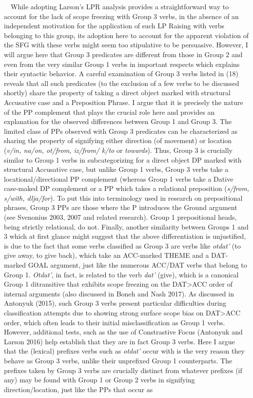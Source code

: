 \documentclass[12pt]{article}
\newenvironment{styleStandard}{\renewcommand\baselinestretch{1.0}\setlength\leftskip{0cm}\setlength\rightskip{0cm plus 1fil}\setlength\parindent{0cm}\setlength\parfillskip{0pt plus 1fil}\setlength\parskip{0in plus 1pt}\writerlistparindent\writerlistleftskip\leavevmode\normalfont\normalsize\writerlistlabel\ignorespaces}{\unskip\vspace{0.111in plus 0.0111in}\par}
\newcommand\writerlistleftskip{}
\newcommand\writerlistparindent{}
\newcommand\writerlistlabel{}
\begin{document}
\begin{styleStandard}
\ \ While adopting Larson's LPR analysis provides a straightforward way to account for the lack of scope freezing with Group 3 verbs, in the absence of an independent motivation for the application of such LP Raising with verbs belonging to this group, its adoption here to account for the apparent violation of the SFG with these verbs might seem too stipulative to be persuasive. However, I will argue here that Group 3 predicates are different from those in Group 2 and even from the very similar Group 1 verbs in important respects which explains their syntactic behavior. A careful examination of Group 3 verbs listed in (18) reveals that all such predicates (to the exclusion of a few verbs to be discussed shortly) share the property of taking a direct object marked with structural Accusative case and a Preposition Phrase. I argue that it is precisely the nature of the PP complement that plays the crucial role here and provides an explanation for the observed differences between Group 1 and Group 3. The limited class of PPs observed with Group 3 predicates can be characterized as sharing the property of signifying either direction (of movement) or location (\textit{v/in, na/on, ot/from, iz/from/ k/to }or\textit{ towards}). Thus, Group 3 is crucially similar to Group 1 verbs in subcategorizing for a direct object DP marked with structural Accusative case, but unlike Group 1 verbs, Group 3 verbs take a locational/directional PP complement (whereas Group 1 verbs take a Dative case-maked DP complement or a PP which takes a relational preposition (\textit{s/from, s/with, dlja/for}). To put this into terminology used in research on prepositional phrases, Group 3 PPs are those where the P introduces the Ground argument (see Svenonius 2003, 2007 and related research). Group 1 prepositional heads, being strictly relational, do not. Finally, another similarity between Groups 1 and 3 which at first glance might suggest that the above differentiation is unjustified, is due to the fact that some verbs classified as Group 3 are verbs like \textit{otdat' }(to give away, to give back), which take an ACC-marked THEME and a DAT-marked GOAL argument, just like the numerous ACC/DAT verbs that belong to Group 1. \textit{Otdat'}, in fact, is related to the verb \textit{dat' }(give), which is a canonical Group 1 ditransitive that exhibits scope freezing on the DAT{\textgreater}ACC order of internal arguments (also discussed in Boneh and Nash 2017). As discussed in Antonyuk (2015), such Group 3 verbs present particular difficulties during classification attempts due to showing strong surface scope bias on DAT{\textgreater}ACC order, which often leads to their initial misclassification as Group 1 verbs. However, additional tests, such as the use of Constrastive Focus (Antonyuk and Larson 2016) help establish that they are in fact Group 3 verbs. Here I argue that the (lexical) prefixes verbs such as \textit{otdat'} occur with is the very reason they behave as Group 3 verbs, unlike their unprefixed Group 1 counterparts. The prefixes taken by Group 3 verbs are crucially distinct from whatever prefixes (if any) may be found with Group 1 or Group 2 verbs in signifying direction/location, just like the PPs that occur as 
\end{styleStandard}
\end{document}
